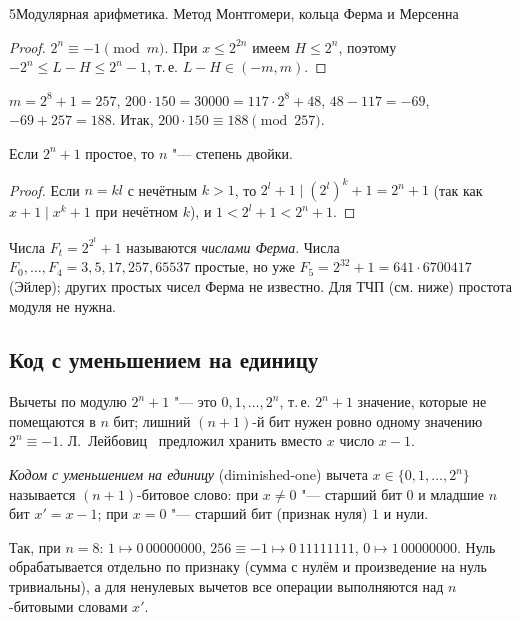\begin{lecture}{5}{Модулярная арифметика. Метод Монтгомери, кольца Ферма и Мерсенна}
\begin{proof}
$2^n \equiv -1 \pmod m$. При $x \le 2^{2n}$ имеем $H \le 2^n$, поэтому
$-2^n \le L - H \le 2^n - 1$, т.\,е. $L - H \in (-m, m)$.
\end{proof}

\begin{example}
$m = 2^8 + 1 = 257$, $200 \cdot 150 = 30000 = 117 \cdot 2^8 + 48$, $48 - 117 = -69$,
$-69 + 257 = 188$. Итак, $200 \cdot 150 \equiv 188 \pmod{257}$.
\end{example}


\begin{proposition}\label{l5:fermat-prime}
Если $2^n + 1$ простое, то $n$ "--- степень двойки.
\end{proposition}

\begin{proof}
Если $n = kl$ с нечётным $k > 1$, то $2^l + 1 \mid (2^l)^k + 1 = 2^n + 1$ (так как
$x + 1 \mid x^k + 1$ при нечётном $k$), и $1 < 2^l + 1 < 2^n + 1$.
\end{proof}

Числа $F_t = 2^{2^t} + 1$ называются \emph{числами Ферма}. Числа $F_0, \dots, F_4 = 3, 5, 17,
257, 65537$ простые, но уже $F_5 = 2^{32} + 1 = 641 \cdot 6700417$ (Эйлер); других простых
чисел Ферма не известно. Для ТЧП (см. ниже) простота модуля не нужна.

\subsection{Код с уменьшением на единицу}

Вычеты по модулю $2^n + 1$ "--- это $0, 1, \dots, 2^n$, т.\,е. $2^n + 1$ значение, которые
не помещаются в $n$ бит; лишний $(n{+}1)$-й бит нужен ровно одному значению
$2^n \equiv -1$. Л.~Лейбовиц~\cite{leibowitz} предложил хранить вместо $x$ число $x - 1$.

\begin{definition}
\emph{Кодом с уменьшением на единицу} (diminished-one) вычета $x \in \{0, 1, \dots, 2^n\}$
называется $(n{+}1)$-битовое слово: при $x \ne 0$ "--- старший бит $0$ и младшие $n$ бит
$x' = x - 1$; при $x = 0$ "--- старший бит (признак нуля) $1$ и нули.
\end{definition}

Так, при $n = 8$: $1 \mapsto 0\,00000000$, $256 \equiv -1 \mapsto 0\,11111111$,
$0 \mapsto 1\,00000000$. Нуль обрабатывается отдельно по признаку (сумма с нулём и
произведение на нуль тривиальны), а для ненулевых вычетов все операции выполняются над
$n$-битовыми словами $x'$.


\end{lecture}
